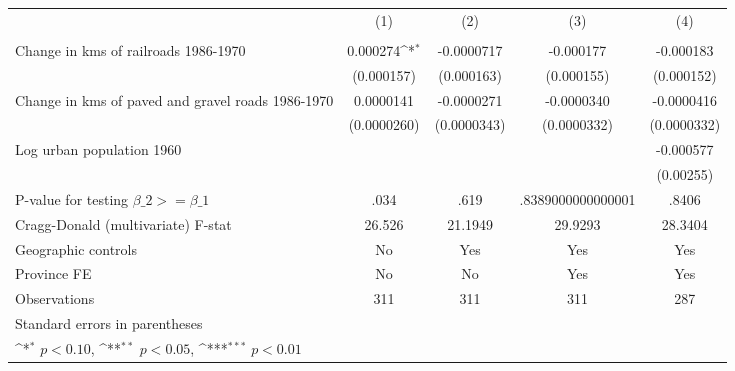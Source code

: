 {
\def\sym#1{\ifmmode^{#1}\else\(^{#1}\)\fi}
\begin{tabular}{l*{4}{c}}
\hline\hline
                &\multicolumn{1}{c}{(1)}&\multicolumn{1}{c}{(2)}&\multicolumn{1}{c}{(3)}&\multicolumn{1}{c}{(4)}\\
                &\multicolumn{1}{c}{}&\multicolumn{1}{c}{}&\multicolumn{1}{c}{}&\multicolumn{1}{c}{}\\
\hline
Change in kms of railroads 1986-1970& 0.000274\sym{*}  &-0.0000717         &-0.000177         &-0.000183         \\
                &(0.000157)         &(0.000163)         &(0.000155)         &(0.000152)         \\
[1em]
Change in kms of paved and gravel roads 1986-1970&0.0000141         &-0.0000271         &-0.0000340         &-0.0000416         \\
                &(0.0000260)         &(0.0000343)         &(0.0000332)         &(0.0000332)         \\
[1em]
Log urban population 1960&                  &                  &                  &-0.000577         \\
                &                  &                  &                  &(0.00255)         \\
\hline
P-value for testing $\beta\_{2} >= \beta\_{1}$&     .034         &     .619         &.8389000000000001         &    .8406         \\
Cragg-Donald (multivariate) F-stat&   26.526         &  21.1949         &  29.9293         &  28.3404         \\
Geographic controls&       No         &      Yes         &      Yes         &      Yes         \\
Province FE     &       No         &       No         &      Yes         &      Yes         \\
Observations    &      311         &      311         &      311         &      287         \\
\hline\hline
\multicolumn{5}{l}{\footnotesize Standard errors in parentheses}\\
\multicolumn{5}{l}{\footnotesize \sym{*} \(p<0.10\), \sym{**} \(p<0.05\), \sym{***} \(p<0.01\)}\\
\end{tabular}
}
